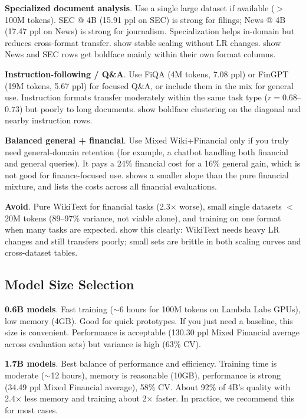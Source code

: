 \textbf{Specialized document analysis}. Use a single large dataset if available ($>$ 100M tokens). SEC @ 4B (15.91 ppl on SEC) is strong for filings; News @ 4B (17.47 ppl on News) is strong for journalism. Specialization helps in-domain but reduces cross-format transfer.  show stable scaling without LR changes.  show News and SEC rows get boldface mainly within their own format columns.

\textbf{Instruction-following / Q\&A}. Use FiQA (4M tokens, 7.08 ppl) or FinGPT (19M tokens, 5.67 ppl) for focused Q\&A, or include them in the mix for general use. Instruction formats transfer moderately within the same task type ($r = 0.68$--$0.73$) but poorly to long documents.  show boldface clustering on the diagonal and nearby instruction rows.

\textbf{Balanced general + financial}. Use Mixed Wiki+Financial only if you truly need general-domain retention (for example, a chatbot handling both financial and general queries). It pays a 24\% financial cost for a 16\% general gain, which is not good for finance-focused use.  shows a smaller slope than the pure financial mixture, and  lists the costs across all financial evaluations.

\textbf{Avoid}. Pure WikiText for financial tasks (2.3$\times$ worse), small single datasets $<$ 20M tokens (89--97\% variance, not viable alone), and training on one format when many tasks are expected.  show this clearly: WikiText needs heavy LR changes and still transfers poorly; small sets are brittle in both scaling curves and cross-dataset tables.

\subsection{Model Size Selection}

\textbf{0.6B models}. Fast training ($\sim$6 hours for 100M tokens on Lambda Labs GPUs), low memory (4GB). Good for quick prototypes. If you just need a baseline, this size is convenient. Performance is acceptable (130.30 ppl Mixed Financial average across evaluation sets) but variance is high (63\% CV).

\textbf{1.7B models}. Best balance of performance and efficiency. Training time is moderate ($\sim$12 hours), memory is reasonable (10GB), performance is strong (34.49 ppl Mixed Financial average), 58\% CV. About 92\% of 4B's quality with 2.4$\times$ less memory and training about 2$\times$ faster. In practice, we recommend this for most cases.

